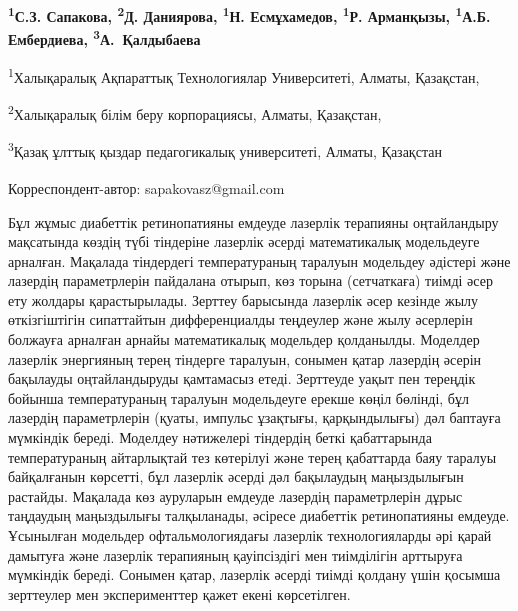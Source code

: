 
\begin{articleheader}

{\bfseries
\textsuperscript{1}С.З. Сапакова\textsuperscript{\envelope },
\textsuperscript{2}Д. Даниярова,
\textsuperscript{1}Н. Есмұхамедов,
\textsuperscript{1}Р. Арманқызы,
\textsuperscript{1}А.Б. Ембердиева,
\textsuperscript{3}А.~Қалдыбаева
}
\end{articleheader}

\begin{affiliation}
\textsuperscript{1}Халықаралық Ақпараттық Технологиялар Университеті, Алматы, Қазақстан,

\textsuperscript{2}Халықаралық білім беру корпорациясы, Алматы, Қазақстан,

\textsuperscript{3}Қазақ ұлттық қыздар педагогикалық университеті, Алматы, Қазақстан

\raggedright \textsuperscript{\envelope }Корреспондент-автор: sapakovasz@gmail.com
\end{affiliation}

Бұл жұмыс диабеттік ретинопатияны емдеуде лазерлік терапияны
оңтайландыру мақсатында көз\-дің түбі тіндеріне лазерлік әсерді
математикалық модельдеуге арналған. Мақалада тіндердегі температураның
таралуын модельдеу әдістері және лазердің параметрлерін пайдалана
отырып, көз торына (сетчаткаға) тиімді әсер ету жолдары қарастырылады.
Зерттеу барысында лазерлік әсер кезінде жылу өткізгіштігін сипаттайтын
дифференциалды теңдеулер және жылу әсерлерін болжауға арналған арнайы
математикалық модельдер қолданылды. Моделдер лазерлік энергияның терең
тіндерге таралуын, сонымен қатар лазердің әсерін бақылауды
оңтайландыруды қамтамасыз етеді. Зерттеуде уақыт пен тереңдік бойынша
температураның таралуын модельдеуге ерекше көңіл бөлінді, бұл лазердің
параметрлерін (қуаты, импульс ұзақтығы, қарқындылығы) дәл баптауға
мүмкіндік береді. Моделдеу нәтижелері тіндердің беткі қабаттарында
температураның айтарлықтай тез көтерілуі және терең қабаттарда баяу
таралуы байқалғанын көрсетті, бұл лазерлік әсерді дәл бақылаудың
маңыздылығын растайды. Мақалада көз ауруларын емдеуде лазердің
параметрлерін дұрыс таңдаудың маңыздылығы талқыланады, әсіресе диабеттік
ретинопатияны емдеуде. Ұсынылған модельдер офтальмологиядағы лазерлік
технологияларды әрі қарай дамытуға және лазерлік терапияның қауіпсіздігі
мен тиімділігін арттыруға мүмкіндік береді. Сонымен қатар, лазерлік
әсерді тиімді қолдану үшін қосымша зерттеулер мен эксперименттер қажет
екені көрсетілген.

